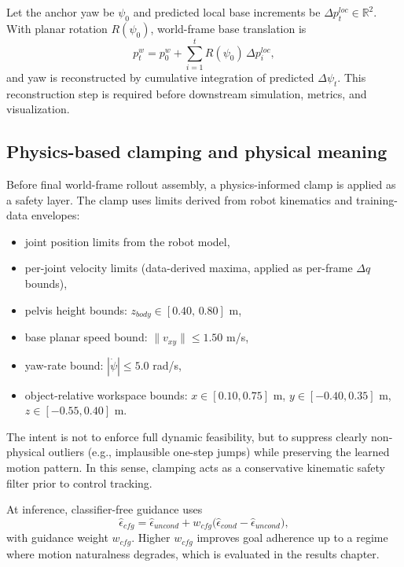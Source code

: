 Let the anchor yaw be $\psi_0$ and predicted local base increments be $\Delta p_t^{loc}\in\mathbb{R}^2$. With planar rotation $R(\psi_0)$, world-frame base translation is
\begin{equation}
p_t^{w} = p_0^{w} + \sum_{i=1}^{t} R(\psi_0)\,\Delta p_i^{loc},
\end{equation}
and yaw is reconstructed by cumulative integration of predicted $\Delta\psi_t$. This reconstruction step is required before downstream simulation, metrics, and visualization.

\subsection{Physics-based clamping and physical meaning}

Before final world-frame rollout assembly, a physics-informed clamp is applied as a safety layer. The clamp uses limits derived from robot kinematics and training-data envelopes:
\begin{itemize}
    \item joint position limits from the robot model,
    \item per-joint velocity limits (data-derived maxima, applied as per-frame $\Delta q$ bounds),
    \item pelvis height bounds: $z_{body}\in[0.40,\,0.80]$ m,
    \item base planar speed bound: $\lVert v_{xy}\rVert \le 1.50$ m/s,
    \item yaw-rate bound: $|\dot\psi| \le 5.0$ rad/s,
    \item object-relative workspace bounds: $x\in[0.10,0.75]$ m, $y\in[-0.40,0.35]$ m, $z\in[-0.55,0.40]$ m.
\end{itemize}

The intent is not to enforce full dynamic feasibility, but to suppress clearly non-physical outliers (e.g., implausible one-step jumps) while preserving the learned motion pattern. In this sense, clamping acts as a conservative kinematic safety filter prior to control tracking.

At inference, classifier-free guidance uses
\begin{equation}
\hat\epsilon_{cfg} = \hat\epsilon_{uncond} + w_{cfg}\big(\hat\epsilon_{cond}-\hat\epsilon_{uncond}\big),
\label{eq:cfg_inference_exp}
\end{equation}
with guidance weight $w_{cfg}$. Higher $w_{cfg}$ improves goal adherence up to a regime where motion naturalness degrades, which is evaluated in the results chapter.

